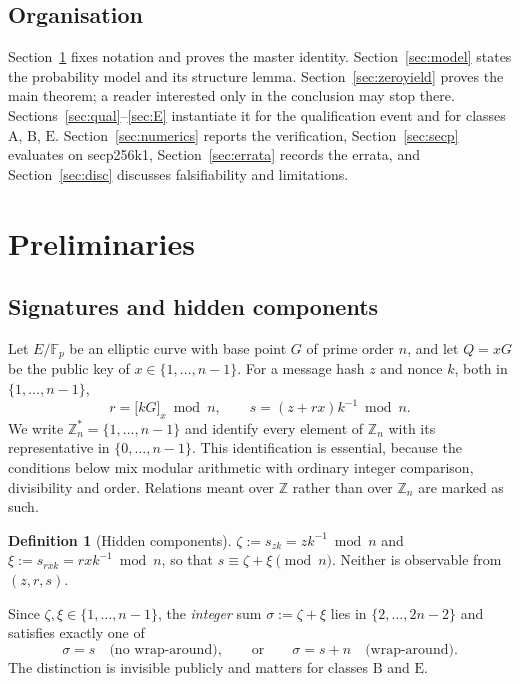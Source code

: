 \documentclass[11pt,a4paper]{article}
\theoremstyle{plain}
\theoremstyle{definition}
\newtheorem{definition}[theorem]{Definition}
\theoremstyle{remark}
\newcommand{\Zs}{\mathbb{Z}_n^{*}}
\newcommand{\Zz}{\mathbb{Z}}
\newcommand{\szk}{s_{zk}}
\newcommand{\srxk}{s_{rxk}}
\newcommand{\clA}{\mathrm{A}}
\newcommand{\clB}{\mathrm{B}}
\newcommand{\clE}{\mathrm{E}}
\begin{document}
\subsection{Organisation}

Section~\ref{sec:prelim} fixes notation and proves the master identity.
Section~\ref{sec:model} states the probability model and its structure lemma.
Section~\ref{sec:zeroyield} proves the main theorem; a reader interested only in the conclusion
may stop there. Sections~\ref{sec:qual}--\ref{sec:E} instantiate it for the qualification event
and for classes $\clA$, $\clB$, $\clE$. Section~\ref{sec:numerics} reports the verification,
Section~\ref{sec:secp} evaluates on secp256k1,
Section~\ref{sec:errata} records the errata, and Section~\ref{sec:disc} discusses falsifiability
and limitations.

\section{Preliminaries}\label{sec:prelim}

\subsection{Signatures and hidden components}

Let $E/\mathbb{F}_p$ be an elliptic curve with base point $G$ of prime order $n$, and let $Q = xG$
be the public key of $x \in \{1,\dots,n-1\}$. For a message hash $z$ and nonce $k$, both in
$\{1,\dots,n-1\}$,
\begin{equation}\label{eq:sign}
  r = \bigl[kG\bigr]_x \bmod n, \qquad s = (z + rx)k^{-1}\bmod n .
\end{equation}
We write $\Zs = \{1,\dots,n-1\}$ and identify every element of $\mathbb{Z}_n$ with its
representative in $\{0,\dots,n-1\}$. This identification is essential, because the conditions below
mix modular arithmetic with ordinary integer comparison, divisibility and order. Relations meant
over $\Zz$ rather than over $\mathbb{Z}_n$ are marked as such.

\begin{definition}[Hidden components]\label{def:hidden}
$\zeta := \szk = zk^{-1}\bmod n$ and $\xi := \srxk = rxk^{-1}\bmod n$, so that
$s \equiv \zeta + \xi \pmod n$. Neither is observable from $(z,r,s)$.
\end{definition}

Since $\zeta,\xi \in \{1,\dots,n-1\}$, the \emph{integer} sum $\sigma := \zeta + \xi$ lies in
$\{2,\dots,2n-2\}$ and satisfies exactly one of
\begin{equation}\label{eq:wrap}
  \sigma = s \quad\text{(no wrap-around)}, \qquad\text{or}\qquad \sigma = s + n \quad\text{(wrap-around)}.
\end{equation}
The distinction is invisible publicly and matters for classes $\clB$ and $\clE$.
\end{document}
